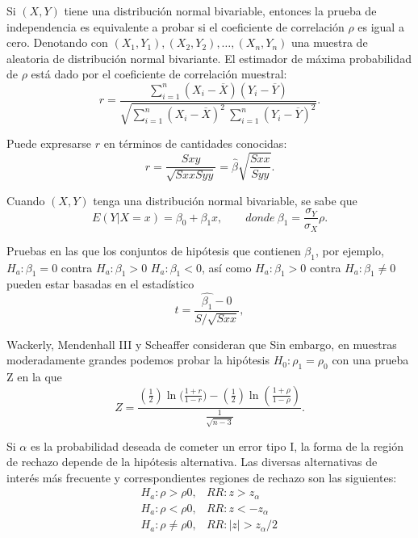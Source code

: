 \documentclass[letterpaper]{article}
\begin{document}
Si $(X, Y)$ tiene una distribución normal bivariable, entonces la prueba de independencia es equivalente a probar si el coeficiente de correlación $\rho$ es igual a cero. Denotando con $(X_1, Y_1), (X_2, Y_2),\ldots , (X_n, Y_n)$ una muestra de aleatoria de distribución normal bivariante. El estimador de máxima probabilidad de $\rho$ está dado por el coeficiente de correlación muestral:
\begin{equation}
r=\frac{\sum_{i=1}^{n}(X_i-\overline{X})(Y_i-\overline{Y})}{\sqrt{\sum_{i=1}^{n}(X_i-\overline{X})^2\ \sum_{i=1}^{n}(Y_i-\overline{Y})^2}}.
\end{equation}

Puede expresarse $r$ en términos de cantidades conocidas:
\begin{equation}
r=\frac{S{xy}}{\sqrt{S{xx}S{yy}}}=\hat{\beta}\sqrt{\frac{S{xx}}{S{yy}}}.
\end{equation}

Cuando $(X, Y)$ tenga una distribución normal bivariable, se sabe que
\begin{equation}
E(Y|X=x)=\beta_0+\beta_1x,\qquad donde\ \beta_1=\frac{\sigma_Y}{\sigma_X}\rho.
\end{equation}

Pruebas en las que los conjuntos de hipótesis que contienen $\beta_1$, por ejemplo, $H_a\colon \beta_1 = 0$ contra $H_a\colon \beta_1 > 0$ $H_a\colon \beta_1 < 0$, así como $H_a\colon \beta_1 > 0$ contra $H_a\colon \beta_1 \neq 0$ pueden estar basadas en el estadístico
\begin{equation}
t=\frac{\hat{\beta_1}-0}{S/\sqrt{S{xx}}},
\end{equation}

Wackerly, Mendenhall III y Scheaffer consideran que  Sin embargo, en muestras moderadamente grandes podemos probar la hipótesis $H_0\colon \rho_1=\rho_0$ con una prueba Z en la que
\begin{equation}
Z=\frac{(\frac{1}{2})\ln({\frac{1+r}{1-r})}-(\frac{1}{2})\ln(\frac{1+\rho}{1-\rho})}{\frac{1}{\sqrt{n-3}}}.
\end{equation}

Si $\alpha$ es la probabilidad deseada de cometer un error tipo I, la forma de la región de rechazo depende de la hipótesis alternativa. Las diversas alternativas de interés más frecuente y correspondientes regiones de rechazo son las siguientes:
\begin{equation}  
\begin{matrix}
H_a\colon\rho>\rho0, &RR\colon z>z_\alpha\ \ \ \ \ \ \\
H_a\colon\rho<\rho0, &RR\colon z<-z_\alpha\ \ \ \ \\
H_a\colon\rho\neq\rho0, &RR\colon | z | >z_\alpha/2
\end{matrix}
\end{equation}
\end{document}

